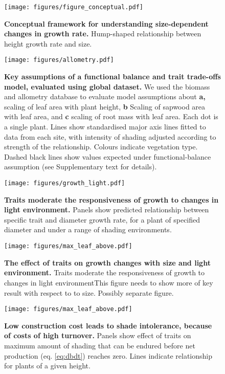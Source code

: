 \documentclass[12pt, a4paper]{article}
\makeatletter
\def\maxwidth{\ifdim\Gin@nat@width>\linewidth\linewidth
\else\Gin@nat@width\fi}
\let\Oldincludegraphics\includegraphics
\renewcommand{\includegraphics}[1]{\Oldincludegraphics[width=\maxwidth]{#1}}
\makeatother
\begin{document}
\newpage

\begin{figure}[ht]
\centering
\texttt{[image: figures/figure\_conceptual.pdf]}
\caption{\textbf{Conceptual framework for understanding size-dependent
changes in growth rate.} Hump-shaped relationship between height growth rate and
size. \label{f-conceptual}}
\end{figure}

\newpage

\begin{figure}[ht]
\centering
\texttt{[image: figures/allometry.pdf]}
\caption{\textbf{Key assumptions of a functional balance and trait
trade-offs model, evaluated using global dataset.} We used the biomass and
allometry database to evaluate model assumptions about \textbf{a,}
scaling of leaf area with plant height, \textbf{b} Scaling of sapwood
area with leaf area, and \textbf{c} scaling of root mass with leaf area.
Each dot is a single plant. Lines show standardised major axis lines
fitted to data from each site, with intensity of shading adjusted
according to strength of the relationship. Colours indicate vegetation
type. Dashed black lines show values expected under functional-balance
assumption (see Supplementary text for details). \label{f-assumptions}}
\end{figure}

\newpage

\begin{figure}[ht]
\centering
\texttt{[image: figures/growth\_light.pdf]}
\caption{\textbf{Traits moderate the responsiveness of growth to changes
in light environment.} Panels show predicted relationship between
specific trait and diameter growth rate, for a plant of specified
diameter and under a range of shading environments.
\label{f-growth_light}}
\end{figure}

\newpage

\begin{figure}[ht]
\centering
\texttt{[image: figures/max\_leaf\_above.pdf]}
\caption{\textbf{The effect of traits on growth changes with size and
light environment.} Traits moderate the responsiveness of growth to changes in light
environmentThis figure needs to show more of key result with respect to to size.
Possibly separate figure. \label{f-shifts}}
\end{figure}

\newpage

\begin{figure}[ht]
\centering
\texttt{[image: figures/max\_leaf\_above.pdf]}
\caption{\textbf{Low construction cost leads to shade intolerance,
because of costs of high turnover.} Panels show effect of traits on
maximum amount of shading that can be endured before net production (eq.
\ref{eq:dbdt}) reaches zero. Lines indicate relationship for plants of a
given height. \label{f-wplcp}}
\end{figure}
\end{document}

